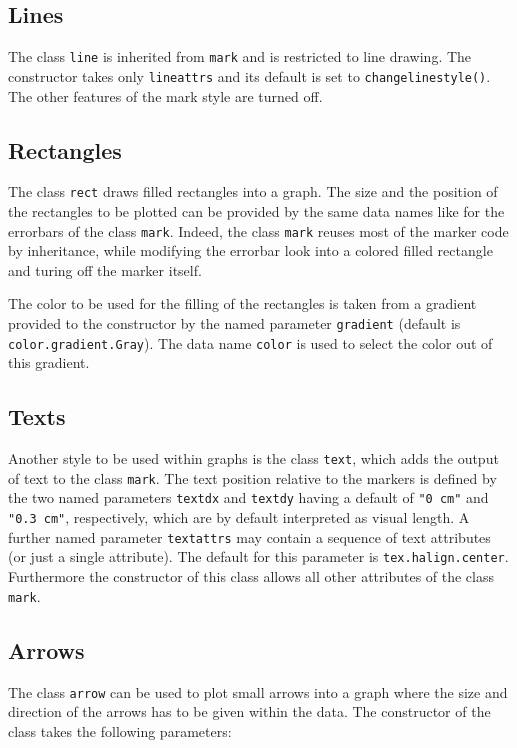 \subsection{Lines}

The class \verb|line| is inherited from \verb|mark| and is restricted
to line drawing. The constructor takes only \verb|lineattrs| and its
default is set to \verb|changelinestyle()|. The other features of the
mark style are turned off.

\subsection{Rectangles}

The class \verb|rect| draws filled rectangles into a graph. The size
and the position of the rectangles to be plotted can be provided by
the same data names like for the errorbars of the class \verb|mark|.
Indeed, the class \verb|mark| reuses most of the marker code by
inheritance, while modifying the errorbar look into a colored filled
rectangle and turing off the marker itself.

The color to be used for the filling of the rectangles is taken from a
gradient provided to the constructor by the named parameter
\verb|gradient| (default is \verb|color.gradient.Gray|). The data
name \verb|color| is used to select the color out of this gradient.

\subsection{Texts}

Another style to be used within graphs is the class \verb|text|, which
adds the output of text to the class \verb|mark|. The text
position relative to the markers is defined by the two named
parameters \verb|textdx| and \verb|textdy| having a default of
\verb|"0 cm"| and \verb|"0.3 cm"|, respectively, which are by default
interpreted as visual length. A further named parameter
\verb|textattrs| may contain a sequence of text attributes (or just a
single attribute). The default for this parameter is
\verb|tex.halign.center|. Furthermore the constructor of this class
allows all other attributes of the class \verb|mark|.

\subsection{Arrows}

The class \verb|arrow| can be used to plot small arrows into a graph
where the size and direction of the arrows has to be given within the
data. The constructor of the class takes the following parameters:

